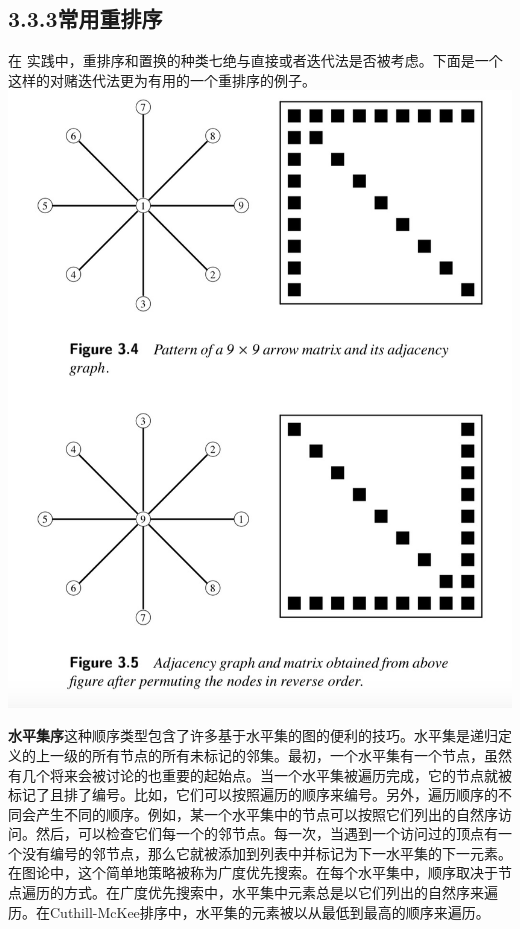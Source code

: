 \documentclass{article}
\begin{document}
\subsection*{3.3.3常用重排序}
在
实践中，重排序和置换的种类七绝与直接或者迭代法是否被考虑。下面是一个这样的对赌迭代法更为有用的一个重排序的例子。
\newline\newline\newline\newline\newline\newline\newline\newline
\newline\newline\newline\newline\newline\newline
\includegraphics[scale=0.25]{3_4_5.png}

\textbf{水平集序}这种顺序类型包含了许多基于水平集的图的便利的技巧。水平集是递归定义的上一级的所有节点的所有未标记的邻集。最初，一个水平集有一个节点，虽然有几个将来会被讨论的也重要的起始点。当一个水平集被遍历完成，它的节点就被标记了且排了编号。比如，它们可以按照遍历的顺序来编号。另外，遍历顺序的不同会产生不同的顺序。例如，某一个水平集中的节点可以按照它们列出的自然序访问。然后，可以检查它们每一个的邻节点。每一次，当遇到一个访问过的顶点有一个没有编号的邻节点，那么它就被添加到列表中并标记为下一水平集的下一元素。在图论中，这个简单地策略被称为广度优先搜索。在每个水平集中，顺序取决于节点遍历的方式。在广度优先搜索中，水平集中元素总是以它们列出的自然序来遍历。在Cuthill-McKee排序中，水平集的元素被以从最低到最高的顺序来遍历。
\end{document}
